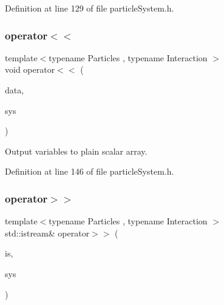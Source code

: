 Definition at line 129 of file particle\+System.\+h.

\mbox{\label{classparticle_system_ab8d056a726e4fe132f019ba998d6e386}} 
\subsubsection{\texorpdfstring{operator$<$$<$}{operator<<}\hspace{0.1cm}{\footnotesize\ttfamily [2/2]}}
{\footnotesize\ttfamily template$<$typename Particles , typename Interaction $>$ \\
void operator$<$$<$ (\begin{DoxyParamCaption}\item[{\mbox{\hyperlink{classparticle_system_a768fe562ed8dcc0973f3d422708835bf}{Dyn\+Scalar\+Array}} \&}]{data,  }\item[{const \mbox{\hyperlink{classparticle_system}{particle\+System}}$<$ \mbox{\hyperlink{struct_particles}{Particles}}, Interaction $>$ \&}]{sys }\end{DoxyParamCaption})\hspace{0.3cm}{\ttfamily [friend]}}



Output variables to plain scalar array. 



Definition at line 146 of file particle\+System.\+h.

\mbox{\label{classparticle_system_a7c8a355dd7f5c30b6f54c341bf672d10}} 
\subsubsection{\texorpdfstring{operator$>$$>$}{operator>>}\hspace{0.1cm}{\footnotesize\ttfamily [1/2]}}
{\footnotesize\ttfamily template$<$typename Particles , typename Interaction $>$ \\
std\+::istream\& operator$>$$>$ (\begin{DoxyParamCaption}\item[{std\+::istream \&}]{is,  }\item[{\mbox{\hyperlink{classparticle_system}{particle\+System}}$<$ \mbox{\hyperlink{struct_particles}{Particles}}, Interaction $>$ \&}]{sys }\end{DoxyParamCaption})\hspace{0.3cm}{\ttfamily [friend]}}



